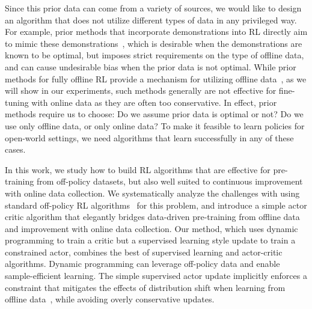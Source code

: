 Since this prior data can come from a variety of sources, we would like to design an algorithm that does not utilize different types of data in any privileged way. For example, prior methods that incorporate demonstrations into RL directly aim to mimic these demonstrations~\citep{nair2018demonstrations}, which is desirable when the demonstrations are known to be optimal, but imposes strict requirements on the type of offline data, and can cause undesirable bias when the prior data is not optimal. While prior methods for fully offline RL provide a mechanism for utilizing offline data~\citep{fujimoto19bcq, kumar19bear}, as we will show in our experiments, such methods generally are not effective for fine-tuning with online data as they are often too conservative. In effect, prior methods require us to choose: Do we assume prior data is optimal or not? Do we use only offline data, or only online data? To make it feasible to learn policies for open-world settings, we need algorithms that learn successfully in any of these cases. 

In this work, we study how to build RL algorithms that are effective for pre-training from off-policy datasets, but also well suited to continuous improvement with online data collection. We systematically analyze the challenges with using standard off-policy RL algorithms~\citep{haarnoja2018sac, kumar19bear, we2018mpo} for this problem, and introduce a simple actor critic algorithm that elegantly bridges data-driven pre-training from offline data and improvement with online data collection. Our method, which uses dynamic programming to train a critic but a supervised learning style update to train a constrained actor, combines the best of supervised learning and actor-critic algorithms. Dynamic programming can leverage off-policy data and enable sample-efficient learning. The simple supervised actor update implicitly enforces a constraint that mitigates the effects of distribution shift when learning from offline data~\citep{fujimoto19bcq, kumar19bear}, while avoiding overly conservative updates.

